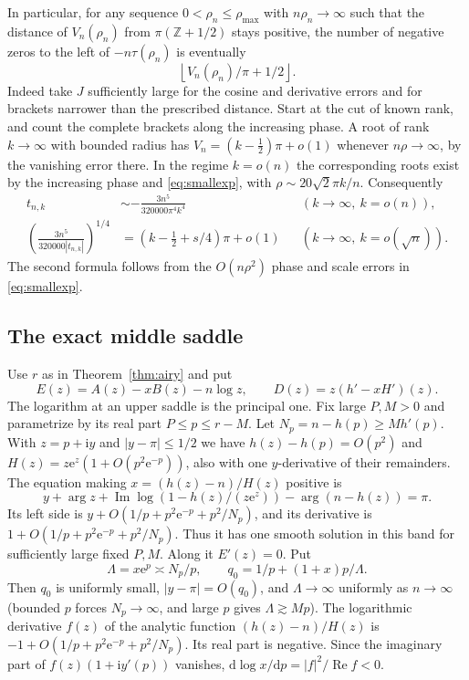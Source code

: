 \documentclass[11pt]{article}
\DeclareMathOperator{\Rea}{Re}
\DeclareMathOperator{\Ima}{Im}
\newcommand{\ee}{\mathrm e}
\newcommand{\ii}{\mathrm i}
\newcommand{\dd}{\mathrm d}
\begin{document}
In particular, for any sequence \(0<\rho_n\le\rho_{\max}\) with \(n\rho_n\to\infty\) such that the distance of \(V_n(\rho_n)\) from \(\pi(\mathbb Z+1/2)\) stays positive, the number of negative zeros to the left of \(-n\tau(\rho_n)\) is eventually
\[
 \left\lfloor V_n(\rho_n)/\pi+1/2\right\rfloor .
\]
Indeed take \(J\) sufficiently large for the cosine and derivative errors and for brackets narrower than the prescribed distance. Start at the cut of known rank, and count the complete brackets along the increasing phase. A root of rank \(k\to\infty\) with bounded radius has \(V_n=(k-\tfrac12)\pi+o(1)\) whenever \(n\rho\to\infty\), by the vanishing error there. In the regime \(k=o(n)\) the corresponding roots exist by the increasing phase and \eqref{eq:smallexp}, with \(\rho\sim20\sqrt2\pi k/n\). Consequently
\begin{align*}
 t_{n,k}&\sim-\frac{3n^5}{320000\pi^4 k^4}
             && (k\to\infty,\ k=o(n)),\\
 \left(\frac{3n^5}{320000|t_{n,k}|}\right)^{1/4}
   &=(k-\tfrac12+s/4)\pi+o(1)
             && (k\to\infty,\ k=o(\sqrt n)).
\end{align*}
The second formula follows from the \(O(n\rho^2)\) phase and scale errors in \eqref{eq:smallexp}.

\subsection{The exact middle saddle}\label{sec:middle}
Use \(r\) as in Theorem~\ref{thm:airy} and put
\[
 E(z)=A(z)-xB(z)-n\log z,\qquad D(z)=z(h'-xH')(z).
\]
The logarithm at an upper saddle is the principal one. Fix large \(P,M>0\) and parametrize by its real part \(P\le p\le r-M\). Let \(N_p=n-h(p)\ge M h'(p)\). With \(z=p+\ii y\) and \(|y-\pi|\le1/2\) we have \(h(z)-h(p)=O(p^2)\) and \(H(z)=z\ee^z(1+O(p^2\ee^{-p}))\), also with one \(y\)-derivative of their remainders. The equation making \(x=(h(z)-n)/H(z)\) positive is
\begin{equation}
 y+\arg z+\Ima\log(1-h(z)/(z\ee^z))-\arg(n-h(z))=\pi .
 \label{eq:midphase}
\end{equation}
Its left side is \(y+O(1/p+p^2\ee^{-p}+p^2/N_p)\), and its derivative is \(1+O(1/p+p^2\ee^{-p}+p^2/N_p)\). Thus it has one smooth solution in this band for sufficiently large fixed \(P,M\). Along it \(E'(z)=0\). Put
\[
 \Lambda=x\ee^p\asymp N_p/p,\qquad q_0=1/p+(1+x)p/\Lambda.
\]
Then \(q_0\) is uniformly small, \(|y-\pi|=O(q_0)\), and \(\Lambda\to\infty\) uniformly as \(n\to\infty\) (bounded \(p\) forces \(N_p\to\infty\), and large \(p\) gives \(\Lambda\gtrsim Mp\)). The logarithmic derivative \(f(z)\) of the analytic function \((h(z)-n)/H(z)\) is \(-1+O(1/p+p^2\ee^{-p}+p^2/N_p)\). Its real part is negative. Since the imaginary part of \(f(z)(1+\ii y'(p))\) vanishes, \(\dd\log x/\dd p=|f|^2/\Rea f<0\).
\end{document}
